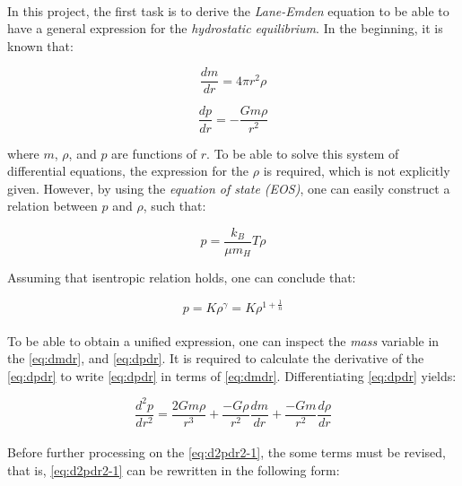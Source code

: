 \documentclass[letterpaper,12pt]{article}
\begin{document}
\paragraph{} In this project, the first task is to derive the \textit{Lane-Emden} equation to be able to have a general expression for the \textit{hydrostatic equilibrium}. In the beginning, it is known that:

\begin{equation}
    \label{eq:dmdr}
    \frac{dm}{dr} = 4\pi r^2\rho
\end{equation}

\begin{equation}
    \label{eq:dpdr}
    \frac{dp}{dr} = -\frac{Gm\rho}{r^2}
\end{equation}

where $m$, $\rho$, and $p$ are functions of $r$. To be able to solve this system of differential equations, the expression for the $\rho$ is required, which is not explicitly given. However, by using the \textit{equation of state (EOS)}, one can easily construct a relation between $p$ and $\rho$, such that:

\begin{equation*}
    p = \frac{k_B}{\mu m_H}T\rho
\end{equation*}

Assuming that isentropic relation holds, one can conclude that:

\begin{equation}
    \label{eq:istro}
    p = K\rho^\gamma=K\rho^{1 + \frac{1}{n}} 
\end{equation}

\paragraph{} To be able to obtain a unified expression, one can inspect the \textit{mass} variable in the \eqref{eq:dmdr}, and \eqref{eq:dpdr}. It is required to calculate the derivative of the \eqref{eq:dpdr} to write \eqref{eq:dpdr} in terms of \eqref{eq:dmdr}. Differentiating \eqref{eq:dpdr} yields:

\begin{equation}
    \label{eq:d2pdr2-1}
    \frac{d^2p}{dr^2} = \frac{2Gm\rho}{r^3} + \frac{-G\rho}{r^2}\frac{dm}{dr} + \frac{-Gm}{r^2}\frac{d\rho}{dr}
\end{equation}

\paragraph{} Before further processing on the \eqref{eq:d2pdr2-1}, the some terms must be revised, that is, \eqref{eq:d2pdr2-1} can be rewritten in the following form:
\end{document}
